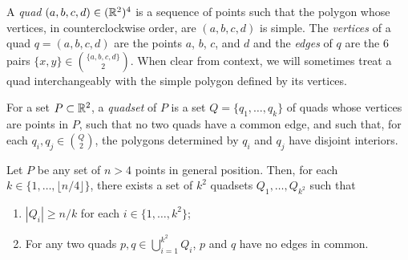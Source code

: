 \documentclass{patmorin}
\begin{document}
A \emph{quad} $(a,b,c,d)\in(\mathbb{R}^2)^4$ is a sequence of points such that
the polygon whose vertices, in counterclockwise order, are $(a,b,c,d)$
is simple.  The \emph{vertices} of a quad $q=(a,b,c,d)$ are the points
$a$, $b$, $c$, and $d$ and the \emph{edges} of $q$ are the 6 pairs
$\{x,y\}\in\binom{\{a,b,c,d\}}{2}$.  When clear from context, we will
sometimes treat a quad interchangeably with the simple polygon defined
by its vertices.

For a set $P\subset\mathbb{R}^2$, a \emph{quadset} of $P$ is a set
$Q=\{q_1,\ldots,q_k\}$ of quads whose vertices are points in $P$,
such that no two quads have a common edge, and such that, for each
$q_i,q_j\in \binom{Q}{2}$, the polygons determined by $q_i$ and $q_j$
have disjoint interiors.

\begin{lem}
  Let $P$ be any set of $n>4$ points in general position.  Then, for
  each $k\in\{1,\ldots,\lfloor n/4\rfloor\}$, there exists a set of $k^2$
  quadsets $Q_1,\ldots,Q_{k^2}$ such that
  \begin{enumerate}
    \item $|Q_i| \ge n/k$ for each $i\in\{1,\ldots,k^2\}$;
    \item For any two quads $p,q\in \bigcup_{i=1}^{k^2} Q_i$, $p$ and $q$
      have no edges in common.
  \end{enumerate}
\end{lem}
\end{document}
